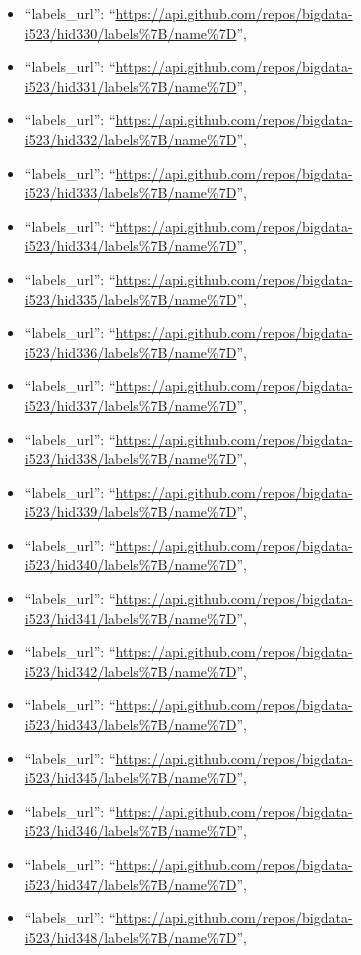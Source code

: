 \begin{itemize}
\item
  ``labels\_url'':
  ``\url{https://api.github.com/repos/bigdata-i523/hid330/labels\%7B/name\%7D}'',
\item
  ``labels\_url'':
  ``\url{https://api.github.com/repos/bigdata-i523/hid331/labels\%7B/name\%7D}'',
\item
  ``labels\_url'':
  ``\url{https://api.github.com/repos/bigdata-i523/hid332/labels\%7B/name\%7D}'',
\item
  ``labels\_url'':
  ``\url{https://api.github.com/repos/bigdata-i523/hid333/labels\%7B/name\%7D}'',
\item
  ``labels\_url'':
  ``\url{https://api.github.com/repos/bigdata-i523/hid334/labels\%7B/name\%7D}'',
\item
  ``labels\_url'':
  ``\url{https://api.github.com/repos/bigdata-i523/hid335/labels\%7B/name\%7D}'',
\item
  ``labels\_url'':
  ``\url{https://api.github.com/repos/bigdata-i523/hid336/labels\%7B/name\%7D}'',
\item
  ``labels\_url'':
  ``\url{https://api.github.com/repos/bigdata-i523/hid337/labels\%7B/name\%7D}'',
\item
  ``labels\_url'':
  ``\url{https://api.github.com/repos/bigdata-i523/hid338/labels\%7B/name\%7D}'',
\item
  ``labels\_url'':
  ``\url{https://api.github.com/repos/bigdata-i523/hid339/labels\%7B/name\%7D}'',
\item
  ``labels\_url'':
  ``\url{https://api.github.com/repos/bigdata-i523/hid340/labels\%7B/name\%7D}'',
\item
  ``labels\_url'':
  ``\url{https://api.github.com/repos/bigdata-i523/hid341/labels\%7B/name\%7D}'',
\item
  ``labels\_url'':
  ``\url{https://api.github.com/repos/bigdata-i523/hid342/labels\%7B/name\%7D}'',
\item
  ``labels\_url'':
  ``\url{https://api.github.com/repos/bigdata-i523/hid343/labels\%7B/name\%7D}'',
\item
  ``labels\_url'':
  ``\url{https://api.github.com/repos/bigdata-i523/hid345/labels\%7B/name\%7D}'',
\item
  ``labels\_url'':
  ``\url{https://api.github.com/repos/bigdata-i523/hid346/labels\%7B/name\%7D}'',
\item
  ``labels\_url'':
  ``\url{https://api.github.com/repos/bigdata-i523/hid347/labels\%7B/name\%7D}'',
\item
  ``labels\_url'':
  ``\url{https://api.github.com/repos/bigdata-i523/hid348/labels\%7B/name\%7D}'',

\end{itemize}
